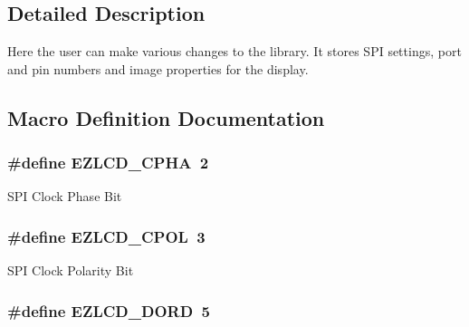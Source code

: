 \subsection{Detailed Description}
Here the user can make various changes to the library. It stores S\-P\-I settings, port and pin numbers and image properties for the display. 

\subsection{Macro Definition Documentation}
\hypertarget{group__ez_l_c_d__103__user__config_ga5317237df9ba416ecac5e89e5bbd4092}{
\subsubsection[{E\-Z\-L\-C\-D\-\_\-\-C\-P\-H\-A}]{\setlength{\rightskip}{0pt plus 5cm}\#define E\-Z\-L\-C\-D\-\_\-\-C\-P\-H\-A~2}}\label{group__ez_l_c_d__103__user__config_ga5317237df9ba416ecac5e89e5bbd4092}
S\-P\-I Clock Phase Bit \hypertarget{group__ez_l_c_d__103__user__config_gafae739752ee0d5822b4a3e3d48bc1a1f}{
\subsubsection[{E\-Z\-L\-C\-D\-\_\-\-C\-P\-O\-L}]{\setlength{\rightskip}{0pt plus 5cm}\#define E\-Z\-L\-C\-D\-\_\-\-C\-P\-O\-L~3}}\label{group__ez_l_c_d__103__user__config_gafae739752ee0d5822b4a3e3d48bc1a1f}
S\-P\-I Clock Polarity Bit \hypertarget{group__ez_l_c_d__103__user__config_ga0001e83f90daec4f19fde73532af43d0}{
\subsubsection[{E\-Z\-L\-C\-D\-\_\-\-D\-O\-R\-D}]{\setlength{\rightskip}{0pt plus 5cm}\#define E\-Z\-L\-C\-D\-\_\-\-D\-O\-R\-D~5}}\label{group__ez_l_c_d__103__user__config_ga0001e83f90daec4f19fde73532af43d0}

